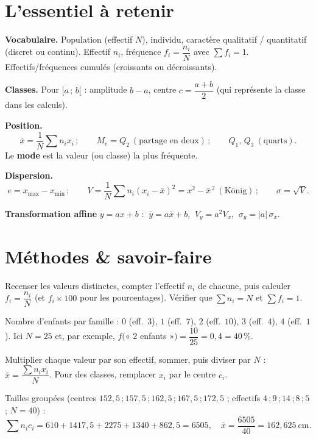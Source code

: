 \section{L'essentiel à retenir}

\begin{synthese}
\textbf{Vocabulaire.} Population (effectif $N$), individu, caractère
qualitatif / quantitatif (discret ou continu). Effectif $n_i$, fréquence
$f_i=\dfrac{n_i}{N}$ avec $\sum f_i=1$. Effectifs/fréquences cumulés (croissants ou
décroissants).

\smallskip
\textbf{Classes.} Pour $[a\,;\,b[$ : amplitude $b-a$, centre $c=\dfrac{a+b}{2}$ (qui
représente la classe dans les calculs).

\smallskip
\textbf{Position.}
\[ \bar x = \frac{1}{N}\sum n_i x_i \,;\qquad
   M_e=Q_2 \ (\text{partage en deux}) \,;\qquad Q_1,\,Q_3 \ (\text{quarts}). \]
Le \textbf{mode} est la valeur (ou classe) la plus fréquente.

\smallskip
\textbf{Dispersion.}
\[ e = x_{\max}-x_{\min} \,;\qquad
   V = \frac{1}{N}\sum n_i (x_i-\bar x)^2 = \overline{x^2}-\bar x^{\,2}
   \ (\text{König}) \,;\qquad \sigma=\sqrt{V}. \]

\smallskip
\textbf{Transformation affine} $y=ax+b$ : $\ \bar y = a\bar x+b$, $\ V_y=a^2V_x$,
$\ \sigma_y=|a|\,\sigma_x$.
\end{synthese}

\section{Méthodes \& savoir-faire}

Recenser les valeurs distinctes, compter l'effectif $n_i$ de chacune, puis calculer
$f_i=\dfrac{n_i}{N}$ (et $f_i\times100$ pour les pourcentages). Vérifier que
$\sum n_i = N$ et $\sum f_i = 1$.
\begin{exemple}
Nombre d'enfants par famille : $0$ (eff.\ $3$), $1$ (eff.\ $7$), $2$ (eff.\ $10$),
$3$ (eff.\ $4$), $4$ (eff.\ $1$). Ici $N=25$ et, par exemple,
$f($« $2$ enfants »$)=\dfrac{10}{25}=0{,}4=40\,\%$.
\end{exemple}

Multiplier chaque valeur par son effectif, sommer, puis diviser par $N$ :
$\bar x=\dfrac{\sum n_i x_i}{N}$. Pour des classes, remplacer $x_i$ par le centre $c_i$.
\begin{exemple}
Tailles groupées (centres $152{,}5\,;157{,}5\,;162{,}5\,;167{,}5\,;172{,}5$ ;
effectifs $4\,;9\,;14\,;8\,;5$ ; $N=40$) :
\[ \sum n_i c_i = 610+1417{,}5+2275+1340+862{,}5 = 6505,\quad
   \bar x = \frac{6505}{40} = 162{,}625\ \text{cm}. \]
\end{exemple}

